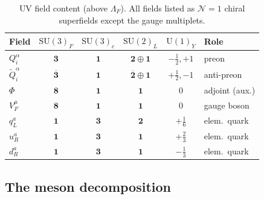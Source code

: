 \documentclass[aps,prd,twocolumn,showpacs,preprintnumbers,superscriptaddress,floatfix]{revtex4-2}
\newcommand{\SU}{\mathrm{SU}}
\newcommand{\UU}{\mathrm{U}}
\begin{document}
\begin{table}
\centering\small
\caption{UV field content (above $\Lambda_F$).
  All fields listed as $\mathcal{N}{=}1$ chiral superfields
  except the gauge multiplets.}
\label{tab:UV_fields}
\begin{tabular}{lccccl}
\hline
Field & $\SU(3)_F$ & $\SU(3)_c$ & $\SU(2)_L$ & $\UU(1)_Y$ & Role \\
\hline
$Q^\alpha_i$ & $\mathbf{3}$ & $\mathbf{1}$ & $\mathbf{2}\oplus\mathbf{1}$ & $-\tfrac{1}{2},+1$ & preon \\
$\tilde{Q}_i^\alpha$ & $\overline{\mathbf{3}}$ & $\mathbf{1}$ & $\overline{\mathbf{2}}\oplus\mathbf{1}$ & $+\tfrac{1}{2},-1$ & anti-preon \\
$\Phi$ & $\mathbf{8}$ & $\mathbf{1}$ & $\mathbf{1}$ & $0$ & adjoint (aux.) \\
$V_F^\mu$ & $\mathbf{8}$ & $\mathbf{1}$ & $\mathbf{1}$ & $0$ & gauge boson \\
$q_L^a$ & $\mathbf{1}$ & $\mathbf{3}$ & $\mathbf{2}$ & $+\tfrac{1}{6}$ & elem.\ quark \\
$u_R^a$ & $\mathbf{1}$ & $\mathbf{3}$ & $\mathbf{1}$ & $+\tfrac{2}{3}$ & elem.\ quark \\
$d_R^a$ & $\mathbf{1}$ & $\mathbf{3}$ & $\mathbf{1}$ & $-\tfrac{1}{3}$ & elem.\ quark \\
\hline
\end{tabular}
\end{table}


\subsection{The meson decomposition}
\end{document}
